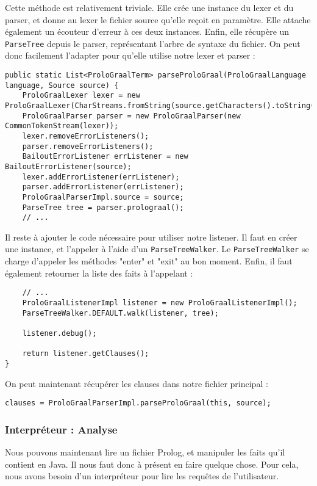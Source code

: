 \documentclass[../report.tex]{subfiles}
\begin{document}
Cette méthode est relativement triviale. Elle crée une instance du lexer et du parser, et donne au lexer le fichier source qu'elle reçoit en paramètre. Elle attache également un écouteur d'erreur à ces deux instances. Enfin, elle récupère un \texttt{ParseTree} depuis le parser, représentant l'arbre de syntaxe du fichier. On peut donc facilement l'adapter pour qu'elle utilise notre lexer et parser :
\begin{verbatim}
public static List<ProloGraalTerm> parseProloGraal(ProloGraalLanguage language, Source source) {
    ProloGraalLexer lexer = new ProloGraalLexer(CharStreams.fromString(source.getCharacters().toString()));
    ProloGraalParser parser = new ProloGraalParser(new CommonTokenStream(lexer));
    lexer.removeErrorListeners();
    parser.removeErrorListeners();
    BailoutErrorListener errListener = new BailoutErrorListener(source);
    lexer.addErrorListener(errListener);
    parser.addErrorListener(errListener);
    ProloGraalParserImpl.source = source;
    ParseTree tree = parser.prolograal();
    // ...
\end{verbatim}
Il reste à ajouter le code nécessaire pour utiliser notre listener. Il faut en créer une instance, et l'appeler à l'aide d'un \texttt{ParseTreeWalker}. Le \texttt{ParseTreeWalker} se charge d'appeler les méthodes "enter" et "exit" au bon moment. Enfin, il faut également retourner la liste des faits à l'appelant :
\begin{verbatim}
    // ...
    ProloGraalListenerImpl listener = new ProloGraalListenerImpl();
    ParseTreeWalker.DEFAULT.walk(listener, tree);

    listener.debug();

    return listener.getClauses();
}
\end{verbatim}
On peut maintenant récupérer les clauses dans notre fichier principal :
\begin{verbatim}
clauses = ProloGraalParserImpl.parseProloGraal(this, source);
\end{verbatim}
\subsubsection{Interpréteur : Analyse}
Nous pouvons maintenant lire un fichier Prolog, et manipuler les faits qu'il contient en Java. Il nous faut donc à présent en faire quelque chose. Pour cela, nous avons besoin d'un interpréteur pour lire les requêtes de l'utilisateur.
\end{document}
